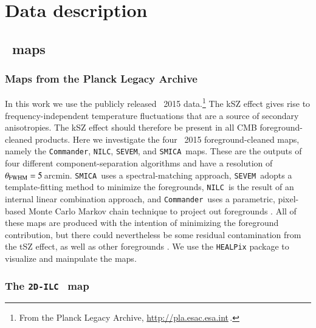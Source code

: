 \documentclass[traditabstract, longauth]{aa}
\newcommand{\nilc}{{\tt NILC}}
\newcommand{\sevem}{{\tt SEVEM}}
\newcommand{\smica}{{\tt SMICA}}
\newcommand{\commander}{{\tt Commander}}
\newcommand{\1}{\'\i }
\begin{document}
\section{Data description}
\label{sec:data}

\subsection{\Planck\ maps}
\label{sec:planck}

\subsubsection{Maps from the Planck Legacy Archive}

In this work we use the publicly released \Planck\ 2015 data.\footnote{From the
Planck Legacy Archive, \url{http://pla.esac.esa.int}\,.}
The kSZ effect gives rise to frequency-independent temperature fluctuations
that are a source of secondary anisotropies. The kSZ effect should therefore
be present
in all CMB foreground-cleaned products. Here we investigate the four \Planck\
2015 foreground-cleaned maps, namely the \commander, \nilc, \sevem, and \smica\
maps.  These are the outputs of four different component-separation algorithms
\citep{planck2015-XXXVII} and have a resolution of $\theta_{\rm
FWHM}=5\,$arcmin. \smica\ uses a spectral-matching approach, \sevem\ adopts a
template-fitting method to minimize the foregrounds, \nilc\ is the result of an
internal linear combination approach, and \commander\ uses a parametric,
pixel-based Monte Carlo Markov chain technique to project out
foregrounds \citep{planck2013-p06, planck2014-a11, planck2014-a12}. All of
these maps are produced with the intention of minimizing the foreground
contribution, but there could nevertheless be some residual contamination from
the tSZ effect, as well as other foregrounds \citep[e.g., the Galactic kSZ
effect, see][]{waelkens2008}.  We use the {\tt HEALPix}
package \citep{gorski2005} to visualize and mainpulate the maps.

\subsubsection{The {\tt 2D-ILC\,} map}
\label{sec:2DILC}
\end{document}
